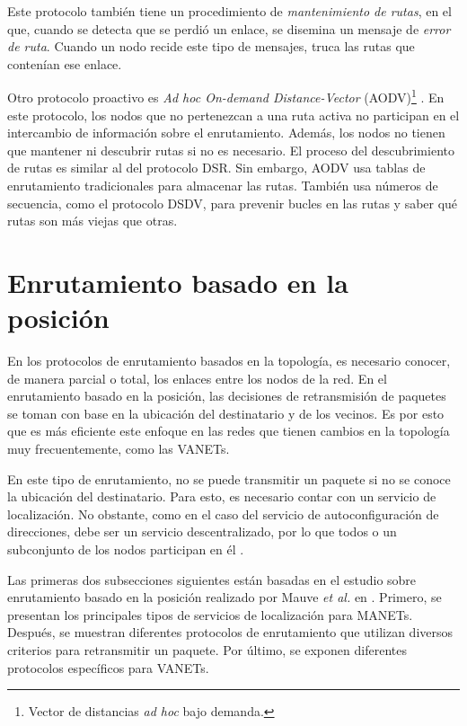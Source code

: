 Este protocolo también tiene un procedimiento de \textit{mantenimiento de
rutas}, en el que, cuando se detecta que se perdió un enlace, se disemina un
mensaje de \textit{error de ruta}. Cuando un nodo recide este tipo de mensajes,
truca las rutas que contenían ese enlace.

Otro protocolo proactivo es \textit{Ad hoc On-demand Distance-Vector}
(AODV)\footnote{Vector de distancias \textit{ad hoc} bajo demanda.}
\cite{Perkins1999}. En este protocolo, los nodos que no pertenezcan a una ruta
activa no participan en el intercambio de información sobre el enrutamiento.
Además, los nodos no tienen que mantener ni descubrir rutas si no es necesario.
El proceso del descubrimiento de rutas es similar al del protocolo DSR. Sin
embargo, AODV usa tablas de enrutamiento tradicionales para almacenar las
rutas. También usa números de secuencia, como el protocolo DSDV, para prevenir
bucles en las rutas y saber qué rutas son más viejas que otras.

\section{Enrutamiento basado en la posición}
\label{sec:enrutamiento_basado_en_la_posicion}

En los protocolos de enrutamiento basados en la topología, es necesario
conocer, de manera parcial o total, los enlaces entre los nodos de la red. En
el enrutamiento basado en la posición, las decisiones de retransmisión de
paquetes se toman con base en la ubicación del destinatario y de los vecinos.
Es por esto que es más eficiente este enfoque en las redes que tienen cambios en
la topología muy frecuentemente, como las VANETs. \cite{Wenden2005}

En este tipo de enrutamiento, no se puede transmitir un paquete si no se conoce
la ubicación del destinatario. Para esto, es necesario contar con un servicio de
localización. No obstante, como en el caso del servicio de autoconfiguración de
direcciones, debe ser un servicio descentralizado, por lo que todos o un
subconjunto de los nodos participan en él \cite{DeMoraisCordeiro2006}.

Las primeras dos subsecciones siguientes están basadas en el estudio sobre
enrutamiento basado en la posición realizado por Mauve \textit{et al.} en
\cite{Mauve2001}. Primero, se presentan los principales tipos de servicios de
localización para MANETs. Después, se muestran diferentes protocolos de
enrutamiento que utilizan diversos criterios para retransmitir un paquete. Por
último, se exponen diferentes protocolos específicos para VANETs.

